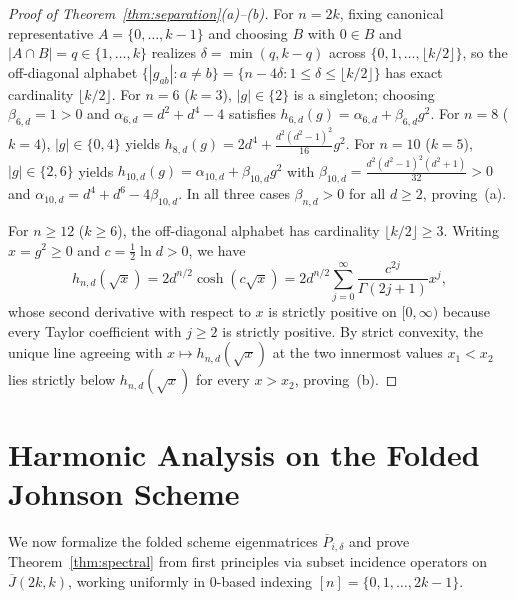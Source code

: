 \documentclass[11pt,reqno]{amsart}
\theoremstyle{definition}
\theoremstyle{remark}
\newcommand{\Jbar}{\overline{J}}
\begin{document}
\begin{proof}[Proof of Theorem~\ref{thm:separation}(a)--(b)]
For $n = 2k$, fixing canonical representative $A = \{0,\dots,k-1\}$ and choosing $B$ with $0 \in B$ and $|A \cap B| = q \in \{1,\dots,k\}$ realizes $\delta = \min(q, k-q)$ across $\{0,1,\dots,\lfloor k/2 \rfloor\}$, so the off-diagonal alphabet $\{|g_{ab}| : a \ne b\} = \{n - 4\delta : 1 \le \delta \le \lfloor k/2 \rfloor\}$ has exact cardinality $\lfloor k/2 \rfloor$.
For $n=6$ ($k=3$), $|g| \in \{2\}$ is a singleton; choosing $\beta_{6,d} = 1 > 0$ and $\alpha_{6,d} = d^2 + d^4 - 4$ satisfies $h_{6,d}(g) = \alpha_{6,d} + \beta_{6,d} g^2$.
For $n=8$ ($k=4$), $|g| \in \{0,4\}$ yields $h_{8,d}(g) = 2d^4 + \frac{d^2(d^2-1)^2}{16} g^2$.
For $n=10$ ($k=5$), $|g| \in \{2,6\}$ yields $h_{10,d}(g) = \alpha_{10,d} + \beta_{10,d} g^2$ with $\beta_{10,d} = \frac{d^2(d^2-1)^2(d^2+1)}{32} > 0$ and $\alpha_{10,d} = d^4 + d^6 - 4\beta_{10,d}$.
In all three cases $\beta_{n,d} > 0$ for all $d \ge 2$, proving~(a).

For $n \ge 12$ ($k \ge 6$), the off-diagonal alphabet has cardinality $\lfloor k/2 \rfloor \ge 3$. Writing $x = g^2 \ge 0$ and $c = \frac{1}{2}\ln d > 0$, we have
\[
h_{n,d}(\sqrt{x}) = 2 d^{n/2} \cosh(c\sqrt{x}) = 2 d^{n/2} \sum_{j=0}^{\infty} \frac{c^{2j}}{\Gamma(2j+1)} x^j,
\]
whose second derivative with respect to $x$ is strictly positive on $[0,\infty)$ because every Taylor coefficient with $j \ge 2$ is strictly positive. By strict convexity, the unique line agreeing with $x \mapsto h_{n,d}(\sqrt{x})$ at the two innermost values $x_1 < x_2$ lies strictly below $h_{n,d}(\sqrt{x})$ for every $x > x_2$, proving~(b).
\end{proof}

\section{Harmonic Analysis on the Folded Johnson Scheme}\label{sec:spectral}

We now formalize the folded scheme eigenmatrices $\overline{P}_{i,\delta}$ and prove Theorem~\ref{thm:spectral} from first principles via subset incidence operators on $\Jbar(2k,k)$, working uniformly in $0$-based indexing $[n] = \{0,1,\dots,2k-1\}$.
\end{document}
